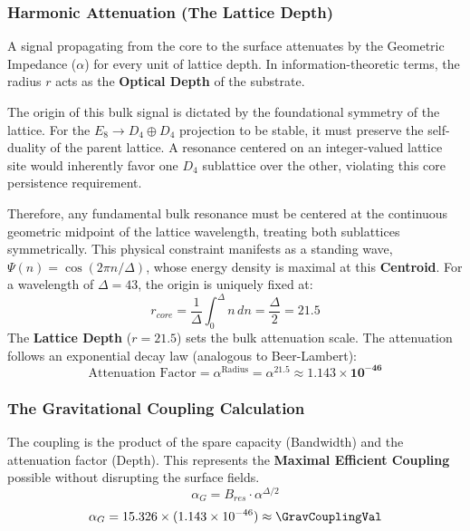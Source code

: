 \subsubsection{Harmonic Attenuation (The Lattice Depth)}
A signal propagating from the core to the surface attenuates by the Geometric Impedance ($\alpha$) for every unit of lattice depth. In information-theoretic terms, the radius $r$ acts as the \textbf{Optical Depth} of the substrate.

The origin of this bulk signal is dictated by the foundational symmetry of the lattice. For the $E_8 \to D_4 \oplus D_4$ projection to be stable, it must preserve the self-duality of the parent lattice. A resonance centered on an integer-valued lattice site would inherently favor one $D_4$ sublattice over the other, violating this core persistence requirement.

Therefore, any fundamental bulk resonance must be centered at the continuous geometric midpoint of the lattice wavelength, treating both sublattices symmetrically. This physical constraint manifests as a standing wave, $\Psi(n) = \cos(2\pi n / \Delta)$, whose energy density is maximal at this \textbf{Centroid}. For a wavelength of $\Delta=43$, the origin is uniquely fixed at:
\begin{equation}
r_{core} = \frac{1}{\Delta} \int_0^\Delta n \, dn = \frac{\Delta}{2} = 21.5
\end{equation}
The \textbf{Lattice Depth} ($r=21.5$) sets the bulk attenuation scale. The attenuation follows an exponential decay law (analogous to Beer-Lambert):
\begin{equation}
\text{Attenuation Factor} = \alpha^{\text{Radius}} = \alpha^{21.5} \approx \mathbf{1.143 \times 10^{-46}}
\end{equation}

\subsubsection{The Gravitational Coupling Calculation}
The coupling is the product of the spare capacity (Bandwidth) and the attenuation factor (Depth). This represents the \textbf{Maximal Efficient Coupling} possible without disrupting the surface fields.
\begin{equation}
\alpha_G = B_{res} \cdot \alpha^{\Delta/2}
\end{equation}
\begin{equation}
\alpha_G = 15.326 \times (1.143 \times 10^{-46}) \approx \mathbf{\GravCouplingVal}
\end{equation}

